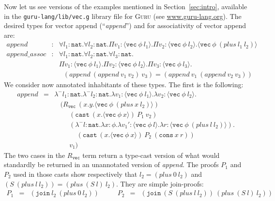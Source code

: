 \documentclass[copyright]{eptcs}
\newcommand{\vc}[0]{\texttt{vec}}
\newcommand{\nat}[0]{\texttt{nat}}
\newcommand{\cons}[0]{\texttt{cons}}
\newcommand{\join}[0]{\texttt{join}}
\newcommand{\cast}[0]{\texttt{cast}}
\begin{document}
Now let us see versions of the examples mentioned in
Section~\ref{sec:intro}, available in the \texttt{guru-lang/lib/vec.g}
library file for \textsc{Guru} (see \url{www.guru-lang.org}).  The
desired types for vector append (``\textit{append}'') and for
associativity of vector append are:
\[
\begin{array}{lll}
\textit{append}& : &\forall l_1:\nat. \forall l_2:\nat. \Pi v_1:\langle \vc\ \phi\ l_1\rangle. \Pi v_2:\langle \vc\ \phi\ l_2\rangle. \langle\vc\ \phi\ (\textit{plus}\ l_1\ l_2)\rangle \\ 
\textit{append\_assoc}& :& \forall l_1:\nat. \forall l_2:\nat.\forall l_3:\nat. \\
\ & \ & \Pi v_1:\langle \vc\ \phi\ l_1\rangle. \Pi v_2:\langle \vc\ \phi\ l_2\rangle. \Pi v_3:\langle \vc\ \phi\ l_3\rangle.\\
\ & \ & \ \ \ (\textit{append}\ (\textit{append}\ v_1\ v_2)\ v_3) = (\textit{append}\ v_1\ (\textit{append}\ v_2\ v_3))
\end{array}
\]
\noindent We consider now annotated inhabitants of these types.  The
first is the following:
{\small
\[
\begin{array}{lll}
\textit{append} &=& \lambda^- l_1:\nat. \lambda^-l_2:\nat. \lambda v_1:\langle \vc\ \phi\ l_1\rangle. \lambda v_2:\langle \vc\ \phi\ l_2\rangle. \\
\ &\ & \ \ \ \ (R_\vc\ (x.y.\langle\vc\ \phi\ (\textit{plus}\ x\ l_2)\rangle)\ \\
\ &\ & \ \ \ \ \ \ \ \ \ \ (\cast\ (x.\langle\vc\ \phi\ x\rangle)\ P_1\ v_2) \\
\ &\ & \ \ \ \ \ \ \ \ \ \ (\lambda^- l:\nat. \lambda x:\phi.\lambda v_1':\langle\vc\ \phi\ l\rangle.
                      \lambda r:\langle\vc\ \phi\ (\textit{plus}\ l\ l_2)\rangle).\\
\ &\ &\ \ \ \ \ \ \ \ \ \ \ \ \ \ \ (\cast\ (x.\langle\vc\ \phi\ x\rangle)\ P_2\ (\cons\ x\ r))\\
\ &\ & \ \ \ \ \ \ \ \ \ \ v_1)
\end{array}
\]}
\noindent The two cases in the $R_\vc$ term return a type-cast version
of what would standardly be returned in an unannotated version of
\textit{append}.  The proofs $P_1$ and $P_2$ used in those casts show
respectively that $l_2 = (\textit{plus}\ 0\ l_2)$ and
$(S\ (\textit{plus}\ l\ l_2)) = (\textit{plus}\ (S\ l)\ l_2)$. They
are simple join-proofs:
\[
\begin{array}{lllllll}
P_1 & = & (\join\ l_2\ (\textit{plus}\ 0\ l_2))&\ \ \ \ \ &
P_2 & = & (\join\ (S\ (\textit{plus}\ l\ l_2))\ (\textit{plus}\ (S\ l)\ l_2))
\end{array}
\]
\end{document}
